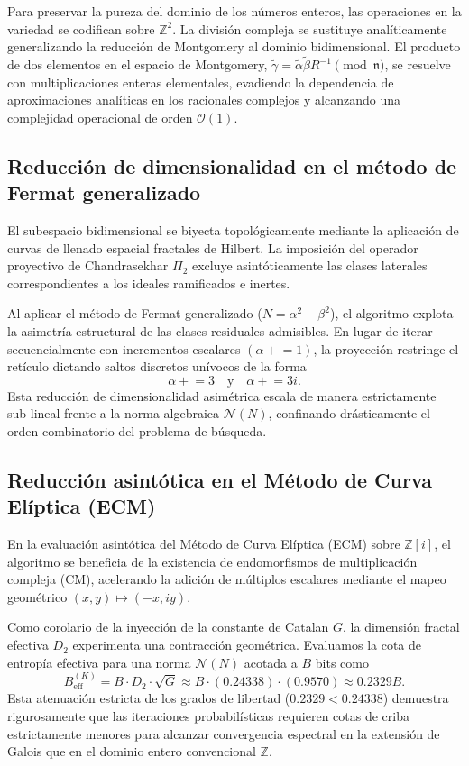 \documentclass{article}
\numberwithin{equation}{section}
\theoremstyle{plain}
\theoremstyle{definition}
\begin{document}
Para preservar la pureza del dominio de los números enteros, las operaciones en la variedad se codifican sobre $\mathbb{Z}^2$. La división compleja se sustituye analíticamente generalizando la reducción de Montgomery al dominio bidimensional. El producto de dos elementos en el espacio de Montgomery, $\tilde{\gamma} = \tilde{\alpha} \tilde{\beta} R^{-1} \pmod{\mathfrak{n}}$, se resuelve con multiplicaciones enteras elementales, evadiendo la dependencia de aproximaciones analíticas en los racionales complejos y alcanzando una complejidad operacional de orden $\mathcal{O}(1)$.

\subsection{Reducción de dimensionalidad en el método de Fermat generalizado}

El subespacio bidimensional se biyecta topológicamente mediante la aplicación de curvas de llenado espacial fractales de Hilbert. La imposición del operador proyectivo de Chandrasekhar $\Pi_2$ excluye asintóticamente las clases laterales correspondientes a los ideales ramificados e inertes. 

Al aplicar el método de Fermat generalizado ($N = \alpha^2 - \beta^2$), el algoritmo explota la asimetría estructural de las clases residuales admisibles. En lugar de iterar secuencialmente con incrementos escalares $(\alpha \mathrel{+}= 1)$, la proyección restringe el retículo dictando saltos discretos unívocos de la forma
\begin{equation}
    \alpha \mathrel{+}= 3 \quad \text{y} \quad \alpha \mathrel{+}= 3i.
\end{equation}
Esta reducción de dimensionalidad asimétrica escala de manera estrictamente sub-lineal frente a la norma algebraica $\mathcal{N}(N)$, confinando drásticamente el orden combinatorio del problema de búsqueda.

\subsection{Reducción asintótica en el Método de Curva Elíptica (ECM)}

En la evaluación asintótica del Método de Curva Elíptica (ECM) sobre $\mathbb{Z}[i]$, el algoritmo se beneficia de la existencia de endomorfismos de multiplicación compleja (CM), acelerando la adición de múltiplos escalares mediante el mapeo geométrico $(x, y) \mapsto (-x, iy)$.

Como corolario de la inyección de la constante de Catalan $G$, la dimensión fractal efectiva $D_2$ experimenta una contracción geométrica. Evaluamos la cota de entropía efectiva para una norma $\mathcal{N}(N)$ acotada a $B$ bits como
\begin{equation}
    B_{\text{eff}}^{(K)} = B \cdot D_2 \cdot \sqrt{G} \approx B \cdot (0.24338) \cdot (0.9570) \approx 0.2329 B.
\end{equation}
Esta atenuación estricta de los grados de libertad ($0.2329 < 0.24338$) demuestra rigurosamente que las iteraciones probabilísticas requieren cotas de criba estrictamente menores para alcanzar convergencia espectral en la extensión de Galois que en el dominio entero convencional $\mathbb{Z}$.
\end{document}
